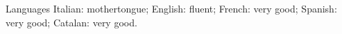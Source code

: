 \begin{paracol}{2}
  Languages
\switchcolumn
  Italian: mothertongue; English: fluent; French: very good; Spanish: very good; Catalan: very good.
\end{paracol}